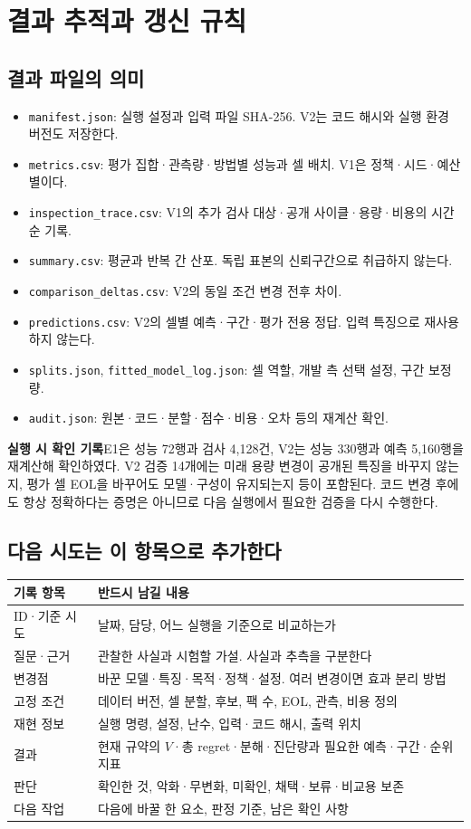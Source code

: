\documentclass[11pt,a4paper]{article}
\newcommand{\file}[1]{{\small\nolinkurl{#1}}}
\begin{document}
\clearpage
\section{결과 추적과 갱신 규칙}
\subsection*{결과 파일의 의미}
\begin{itemize}
\item \file{manifest.json}: 실행 설정과 입력 파일 SHA-256. V2는 코드 해시와 실행 환경 버전도 저장한다.
\item \file{metrics.csv}: 평가 집합·관측량·방법별 성능과 셀 배치. V1은 정책·시드·예산별이다.
\item \file{inspection_trace.csv}: V1의 추가 검사 대상·공개 사이클·용량·비용의 시간순 기록.
\item \file{summary.csv}: 평균과 반복 간 산포. 독립 표본의 신뢰구간으로 취급하지 않는다.
\item \file{comparison_deltas.csv}: V2의 동일 조건 변경 전후 차이.
\item \file{predictions.csv}: V2의 셀별 예측·구간·평가 전용 정답. 입력 특징으로 재사용하지 않는다.
\item \file{splits.json}, \file{fitted_model_log.json}: 셀 역할, 개발 측 선택 설정, 구간 보정량.
\item \file{audit.json}: 원본·코드·분할·점수·비용·오차 등의 재계산 확인.
\end{itemize}

\textbf{실행 시 확인 기록}\quad E1은 성능 72행과 검사 4,128건, V2는 성능 330행과 예측 5,160행을 재계산해 확인하였다. V2 검증 14개에는 미래 용량 변경이 공개된 특징을 바꾸지 않는지, 평가 셀 EOL을 바꾸어도 모델·구성이 유지되는지 등이 포함된다. 코드 변경 후에도 항상 정확하다는 증명은 아니므로 다음 실행에서 필요한 검증을 다시 수행한다.

\subsection*{다음 시도는 이 항목으로 추가한다}
\begin{tabular}{p{.21\linewidth}p{.69\linewidth}}
\toprule
기록 항목 & 반드시 남길 내용 \\
\midrule
ID·기준 시도 & 날짜, 담당, 어느 실행을 기준으로 비교하는가 \\
질문·근거 & 관찰한 사실과 시험할 가설. 사실과 추측을 구분한다 \\
변경점 & 바꾼 모델·특징·목적·정책·설정. 여러 변경이면 효과 분리 방법 \\
고정 조건 & 데이터 버전, 셀 분할, 후보, 팩 수, EOL, 관측, 비용 정의 \\
재현 정보 & 실행 명령, 설정, 난수, 입력·코드 해시, 출력 위치 \\
결과 & 현재 규약의 $V$·총 regret·분해·진단량과 필요한 예측·구간·순위 지표 \\
판단 & 확인한 것, 악화·무변화, 미확인, 채택·보류·비교용 보존 \\
다음 작업 & 다음에 바꿀 한 요소, 판정 기준, 남은 확인 사항 \\
\bottomrule
\end{tabular}
\end{document}
